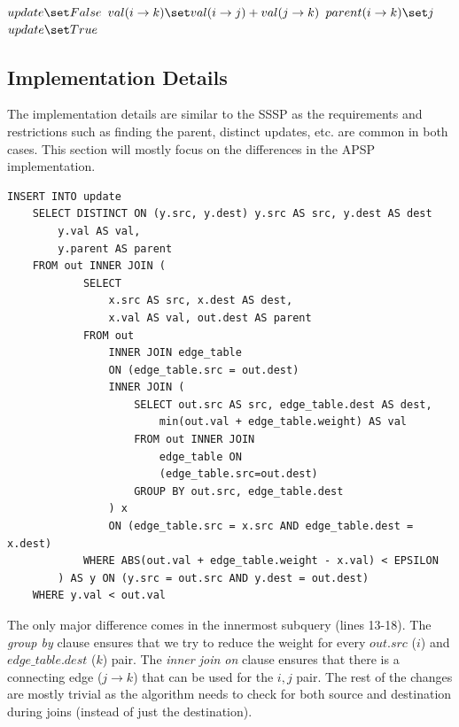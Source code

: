 \begin{algorithm}[APSP$(V,E)$] \label{alg:apsp}
\begin{algorithmic}[1]

		\State $update \set False$
		 			\State $val(i \rightarrow k) \set  val(i \rightarrow j) + val(j \rightarrow k)$
		 			\State $parent(i \rightarrow k) \set j$
		 			\State $update \set True$
		 		\EndIf
			\EndFor
		\EndFor
	\EndWhile
\end{algorithmic}
\end{algorithm}

\subsection{Implementation Details}

The implementation details are similar to the SSSP as the requirements and
restrictions such as finding the parent, distinct updates, etc. are common in
both cases. This section will mostly focus on the differences in the APSP
implementation.

\begin{algorithm}
\label{alg:apsp:findu}
\begin{lstlisting}
INSERT INTO update
	SELECT DISTINCT ON (y.src, y.dest) y.src AS src, y.dest AS dest
		y.val AS val,
		y.parent AS parent
	FROM out INNER JOIN (
			SELECT
				x.src AS src, x.dest AS dest,
				x.val AS val, out.dest AS parent
			FROM out
				INNER JOIN edge_table
				ON (edge_table.src = out.dest)
				INNER JOIN (
					SELECT out.src AS src, edge_table.dest AS dest,
						min(out.val + edge_table.weight) AS val
					FROM out INNER JOIN
						edge_table ON
						(edge_table.src=out.dest)
					GROUP BY out.src, edge_table.dest
				) x
				ON (edge_table.src = x.src AND edge_table.dest = x.dest)
			WHERE ABS(out.val + edge_table.weight - x.val) < EPSILON
		) AS y ON (y.src = out.src AND y.dest = out.dest)
	WHERE y.val < out.val
\end{lstlisting}
\end{algorithm}

The only major difference comes in the innermost subquery (lines 13-18). The
\emph{group by} clause ensures that we try to reduce the weight for every
$out.src$ ($i$) and $edge\_table.dest$ ($k$) pair. The \emph{inner join on}
clause ensures that there is a connecting edge ($j\rightarrow k$) that can be
used for the $i,j$ pair. The rest of the changes are mostly trivial as the
algorithm needs to check for both source and destination during joins (instead
of just the destination).


